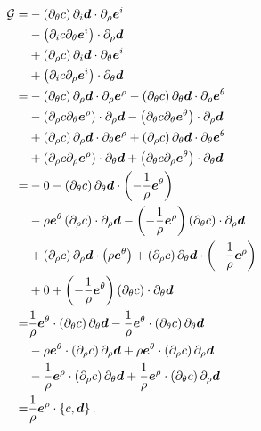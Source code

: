 \begin{align*}
    \mathcal{G}
    =&
    - \left(\partial_\theta c\right) \partial_i \boldsymbol{d}\cdot \partial_\rho \boldsymbol{e}^i
    \\&
    - \left(\partial_i c\partial_\theta\boldsymbol{e}^i\right) \cdot \partial_\rho \boldsymbol{d}
    \\&
    + \left(\partial_\rho c\right) \partial_i \boldsymbol{d} \cdot\partial_\theta \boldsymbol{e}^i
    \\&
    + \left(\partial_i c\partial_\rho\boldsymbol{e}^i\right) \cdot \partial_\theta \boldsymbol{d}
    \\
    =&
    - \left(\partial_\theta c\right) \partial_\rho \boldsymbol{d} \cdot\partial_\rho \boldsymbol{e}^\rho
    - \left(\partial_\theta c\right) \partial_\theta \boldsymbol{d} \cdot\partial_\rho \boldsymbol{e}^\theta
    \\&
    - \left(\partial_\rho c\partial_\theta\boldsymbol{e}^\rho\right) \cdot \partial_\rho \boldsymbol{d}
    - \left(\partial_\theta c\partial_\theta\boldsymbol{e}^\theta\right) \cdot \partial_\rho \boldsymbol{d}
    \\&
    + \left(\partial_\rho c\right) \partial_\rho \boldsymbol{d} \cdot\partial_\theta \boldsymbol{e}^\rho
    + \left(\partial_\rho c\right) \partial_\theta \boldsymbol{d} \cdot\partial_\theta \boldsymbol{e}^\theta
    \\&
    + \left(\partial_\rho c\partial_\rho\boldsymbol{e}^\rho\right) \cdot \partial_\theta \boldsymbol{d}
    + \left(\partial_\theta c\partial_\rho\boldsymbol{e}^\theta\right) \cdot \partial_\theta \boldsymbol{d}
    \\
    =&
    - 0
    - \left(\partial_\theta c\right) \partial_\theta \boldsymbol{d} \cdot\left(-\frac{1}{\rho}\boldsymbol{e}^\theta\right)
    \\&
    - \rho\boldsymbol{e}^\theta\left(\partial_\rho c\right) \cdot \partial_\rho \boldsymbol{d}
    - \left(-\frac{1}{\rho}\boldsymbol{e}^\rho\right)\left(\partial_\theta c\right) \cdot \partial_\rho \boldsymbol{d}
    \\&
    + \left(\partial_\rho c\right) \partial_\rho \boldsymbol{d} \cdot\left(\rho \boldsymbol{e}^\theta\right)
    + \left(\partial_\rho c\right) \partial_\theta \boldsymbol{d} \cdot\left(-\frac{1}{\rho}\boldsymbol{e}^\rho\right)
    \\&
    + 0
    + \left(-\frac{1}{\rho}\boldsymbol{e}^\theta\right)\left(\partial_\theta c\right) \cdot \partial_\theta \boldsymbol{d}
    \\
    =&
     \frac{1}{\rho}\boldsymbol{e}^\theta \cdot \left(\partial_\theta c\right) \partial_\theta \boldsymbol{d}
    -\frac{1}{\rho}\boldsymbol{e}^\theta \cdot \left(\partial_\theta c\right) \partial_\theta \boldsymbol{d}
    \\&
    - \rho \boldsymbol{e}^\theta \cdot \left(\partial_\rho c\right) \partial_\rho \boldsymbol{d}
    + \rho \boldsymbol{e}^\theta \cdot \left(\partial_\rho c\right) \partial_\rho \boldsymbol{d}
    \\&
    - \frac{1}{\rho}\boldsymbol{e}^\rho \cdot \left(\partial_\rho   c\right)\partial_\theta \boldsymbol{d}
    + \frac{1}{\rho}\boldsymbol{e}^\rho \cdot \left(\partial_\theta c\right)\partial_\rho   \boldsymbol{d}
    \\
    =&
    \frac{1}{\rho}\boldsymbol{e}^\rho \cdot \left\{c, \boldsymbol{d}\right\}.
\end{align*}
